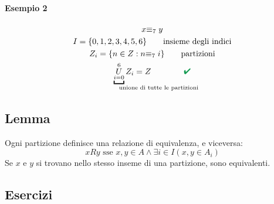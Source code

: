 \documentclass[italian]{article}
\newcommand{\congruente}[1]{\text{$\equiv_{#1}\;$}}
\renewcommand{\checkmark}{\textcolor{ForestGreen}{\text{$\qquad$\ding{52}}}}
\begin{document}
\paragraph{Esempio 2}
\begin{gather*}
	x \congruente{7} y \\
	I = \{ 0,1,2,3,4,5,6 \} \qquad \text{insieme degli indici}\\
	Z_i = \{ n \in Z : n \congruente{7} i \} \qquad \text{partizioni} \\
	\underbracket{\underset{i = 0}{\overset{6}{U}}}_{\mathrlap{\text{unione di tutte le partizioni}}} Z_i = Z \qquad  \checkmark 
\end{gather*}

\subsection{Lemma}
Ogni partizione definisce una relazione di equivalenza, e viceversa:
\[
xRy \text{ sse } x,y \in A \land \exists i\in I (x,y \in A_i)
\]
Se $x$ e $y$ si trovano nello stesso inseme di una partizione, sono equivalenti.

\subsection{Esercizi}
\end{document}
